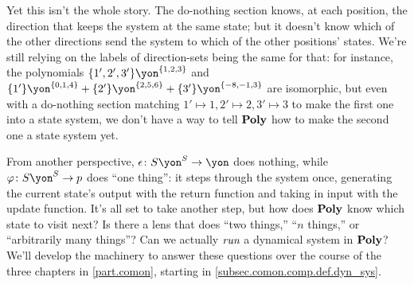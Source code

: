 \documentclass[Book-Poly]{subfiles}
\begin{document}
\begin{example}
Yet this isn't the whole story.
The do-nothing section knows, at each position, the direction that keeps the system at the same state; but it doesn't know which of the other directions send the system to which of the other positions' states.
We're still relying on the labels of direction-sets being the same for that: for instance, the polynomials $\{1',2',3'\}\yon^{\{1,2,3\}}$ and $\{1'\}\yon^{\{0,1,4\}}+\{2'\}\yon^{\{2,5,6\}}+\{3'\}\yon^{\{-8,-1,3\}}$ are isomorphic, but even with a do-nothing section matching $1'\mapsto1,2'\mapsto2,3'\mapsto3$ to make the first one into a state system, we don't have a way to tell $\mathbf{Poly}$ how to make the second one a state system yet.

From another perspective, $\epsilon\colon S\yon^S\to\yon$ does nothing, while $\varphi\colon S\yon^S\to p$ does ``one thing'': it steps through the system once, generating the current state's output with the return function and taking in input with the update function.
It's all set to take another step, but how does $\mathbf{Poly}$ know which state to visit next?
Is there a lens that does ``two things,'' ``$n$ things,'' or ``arbitrarily many things''?
Can we actually $\emph{run}$ a dynamical system in $\mathbf{Poly}$?
We'll develop the machinery to answer these questions over the course of the three chapters in \cref{part.comon}, starting in \cref{subsec.comon.comp.def.dyn_sys}.
\end{example}
\end{document}
